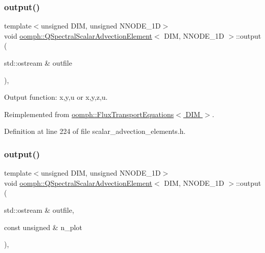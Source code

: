 \subsubsection{\texorpdfstring{output()}{output()}\hspace{0.1cm}{\footnotesize\ttfamily [1/2]}}
{\footnotesize\ttfamily template$<$unsigned D\+IM, unsigned N\+N\+O\+D\+E\+\_\+1D$>$ \\
void \hyperlink{classoomph_1_1QSpectralScalarAdvectionElement}{oomph\+::\+Q\+Spectral\+Scalar\+Advection\+Element}$<$ D\+IM, N\+N\+O\+D\+E\+\_\+1D $>$\+::output (\begin{DoxyParamCaption}\item[{std\+::ostream \&}]{outfile }\end{DoxyParamCaption})\hspace{0.3cm}{\ttfamily [inline]}, {\ttfamily [virtual]}}



Output function\+: x,y,u or x,y,z,u. 



Reimplemented from \hyperlink{classoomph_1_1FluxTransportEquations_afd690f82a24bc20b686fc7d25a59f775}{oomph\+::\+Flux\+Transport\+Equations$<$ D\+I\+M $>$}.



Definition at line 224 of file scalar\+\_\+advection\+\_\+elements.\+h.

\mbox{\label{classoomph_1_1QSpectralScalarAdvectionElement_a5d4b75608288e93077aa3132e56a113b}} 
\subsubsection{\texorpdfstring{output()}{output()}\hspace{0.1cm}{\footnotesize\ttfamily [2/2]}}
{\footnotesize\ttfamily template$<$unsigned D\+IM, unsigned N\+N\+O\+D\+E\+\_\+1D$>$ \\
void \hyperlink{classoomph_1_1QSpectralScalarAdvectionElement}{oomph\+::\+Q\+Spectral\+Scalar\+Advection\+Element}$<$ D\+IM, N\+N\+O\+D\+E\+\_\+1D $>$\+::output (\begin{DoxyParamCaption}\item[{std\+::ostream \&}]{outfile,  }\item[{const unsigned \&}]{n\+\_\+plot }\end{DoxyParamCaption})\hspace{0.3cm}{\ttfamily [inline]}, {\ttfamily [virtual]}}



